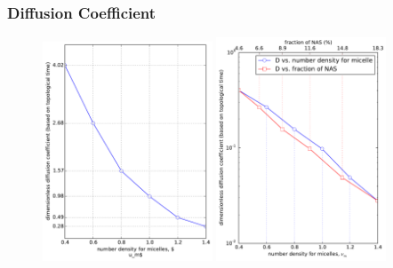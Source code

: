 \documentclass[slidestop, compress, mathserif]{beamer}
\begin{document}
\begin{frame}
  \frametitle{Diffusion Coefficient}
  \begin{figure}
    \centering
    \includegraphics[width=0.45\textwidth]{../diffusion_coefficient.pdf}
    \includegraphics[width=0.45\textwidth]{../diffusion_coefficient_semilogy.pdf}
  \end{figure}
\end{frame}
\end{document}
